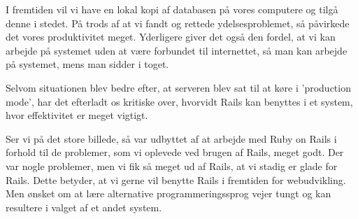 I fremtiden vil vi have en lokal kopi af databasen på vores computere og tilgå denne i stedet. På trods af at vi fandt og rettede ydelsesproblemet, så påvirkede det vores produktivitet meget. Yderligere giver det også den fordel, at vi kan arbejde på systemet uden at være forbundet til internettet, så man \fx kan arbejde på systemet, mens man sidder i toget.

Selvom situationen blev bedre efter, at serveren blev sat til at køre i 'production mode', har det efterladt os kritiske over, hvorvidt Rails kan benyttes i et system, hvor effektivitet er meget vigtigt.

Ser vi på det store billede, så var udbyttet af at arbejde med Ruby on Rails i forhold til de problemer, som vi oplevede ved brugen af Rails, meget godt. Der var nogle problemer, men vi fik så meget ud af Rails, at vi stadig er glade for Rails. Dette betyder, at vi gerne vil benytte Rails i fremtiden for webudvikling. Men ønsket om at lære alternative programmeringssprog vejer tungt og kan resultere i valget af et andet system.
